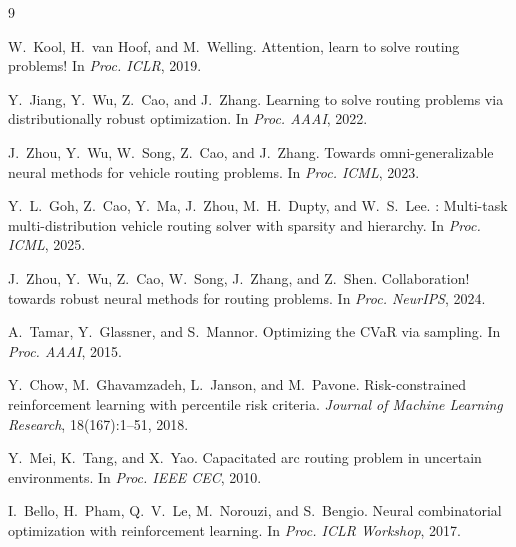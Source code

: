 \documentclass[11pt]{article}
\begin{document}

\begin{thebibliography}{9}

W.~Kool, H.~van Hoof, and M.~Welling.
\newblock Attention, learn to solve routing problems!
\newblock In \emph{Proc. ICLR}, 2019.

Y.~Jiang, Y.~Wu, Z.~Cao, and J.~Zhang.
\newblock Learning to solve routing problems via distributionally robust
  optimization.
\newblock In \emph{Proc. AAAI}, 2022.

J.~Zhou, Y.~Wu, W.~Song, Z.~Cao, and J.~Zhang.
\newblock Towards omni-generalizable neural methods for vehicle routing
  problems.
\newblock In \emph{Proc. ICML}, 2023.

Y.~L.~Goh, Z.~Cao, Y.~Ma, J.~Zhou, M.~H.~Dupty, and W.~S.~Lee.
: Multi-task multi-distribution vehicle routing solver with
  sparsity and hierarchy.
\newblock In \emph{Proc. ICML}, 2025.

J.~Zhou, Y.~Wu, Z.~Cao, W.~Song, J.~Zhang, and Z.~Shen.
\newblock Collaboration! towards robust neural methods for routing problems.
\newblock In \emph{Proc. NeurIPS}, 2024.

A.~Tamar, Y.~Glassner, and S.~Mannor.
\newblock Optimizing the {CVaR} via sampling.
\newblock In \emph{Proc. AAAI}, 2015.

Y.~Chow, M.~Ghavamzadeh, L.~Janson, and M.~Pavone.
\newblock Risk-constrained reinforcement learning with percentile risk
  criteria.
\newblock \emph{Journal of Machine Learning Research}, 18(167):1--51, 2018.

Y.~Mei, K.~Tang, and X.~Yao.
\newblock Capacitated arc routing problem in uncertain environments.
\newblock In \emph{Proc. IEEE CEC}, 2010.

I.~Bello, H.~Pham, Q.~V.~Le, M.~Norouzi, and S.~Bengio.
\newblock Neural combinatorial optimization with reinforcement learning.
\newblock In \emph{Proc. ICLR Workshop}, 2017.

\end{thebibliography}
\end{document}

